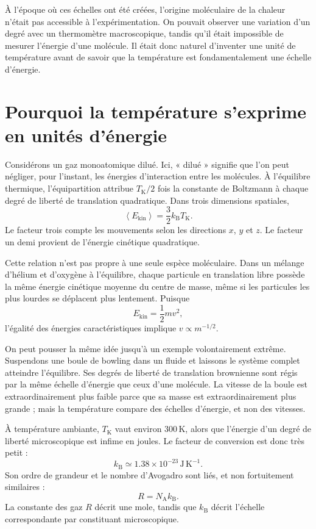 À l’époque où ces échelles ont été créées, l’origine moléculaire de la chaleur n’était pas accessible à l’expérimentation. On pouvait observer une variation d’un degré avec un thermomètre macroscopique, tandis qu’il était impossible de mesurer l’énergie d’une molécule. Il était donc naturel d’inventer une unité de température avant de savoir que la température est fondamentalement une échelle d’énergie.

\section{Pourquoi la température s’exprime en unités d’énergie}

Considérons un gaz monoatomique dilué. Ici, « dilué » signifie que l’on peut négliger, pour l’instant, les énergies d’interaction entre les molécules. À l’équilibre thermique, l’équipartition attribue \(T_{\mathrm K}/2\) fois la constante de Boltzmann à chaque degré de liberté de translation quadratique. Dans trois dimensions spatiales,
\begin{equation}
 \left\langle E_{\mathrm{kin}}\right\rangle
 =\frac{3}{2}k_{\mathrm B}T_{\mathrm K}.
 \label{eq:sm2-equipartition-kelvin}
\end{equation}
Le facteur trois compte les mouvements selon les directions \(x\), \(y\) et \(z\). Le facteur un demi provient de l’énergie cinétique quadratique.

Cette relation n’est pas propre à une seule espèce moléculaire. Dans un mélange d’hélium et d’oxygène à l’équilibre, chaque particule en translation libre possède la même énergie cinétique moyenne du centre de masse, même si les particules les plus lourdes se déplacent plus lentement. Puisque
\begin{equation}
 E_{\mathrm{kin}}=\frac{1}{2}mv^2,
\end{equation}
l’égalité des énergies caractéristiques implique \(v\propto m^{-1/2}\).

On peut pousser la même idée jusqu’à un exemple volontairement extrême. Suspendons une boule de bowling dans un fluide et laissons le système complet atteindre l’équilibre. Ses degrés de liberté de translation brownienne sont régis par la même échelle d’énergie que ceux d’une molécule. La vitesse de la boule est extraordinairement plus faible parce que sa masse est extraordinairement plus grande ; mais la température compare des échelles d’énergie, et non des vitesses.

À température ambiante, \(T_{\mathrm K}\) vaut environ \(300\,\mathrm K\), alors que l’énergie d’un degré de liberté microscopique est infime en joules. Le facteur de conversion est donc très petit :
\begin{equation}
 k_{\mathrm B}\simeq 1.38\times10^{-23}\,
 \mathrm{J\,K^{-1}}.
 \label{eq:sm2-boltzmann-value}
\end{equation}
Son ordre de grandeur et le nombre d’Avogadro sont liés, et non fortuitement similaires :
\begin{equation}
 R=N_{\mathrm A}k_{\mathrm B}.
\end{equation}
La constante des gaz \(R\) décrit une mole, tandis que \(k_{\mathrm B}\) décrit l’échelle correspondante par constituant microscopique.

